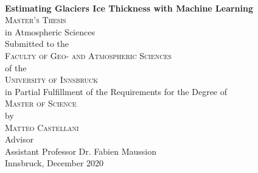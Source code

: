 \begin{titlepage}
\begin{center}

~\\[15mm]
{\Huge  {\bf Estimating Glaciers Ice Thickness with Machine Learning}}\\[5mm]




{\Large \textsc{Master's Thesis}} \\[15mm]


{\large in Atmospheric Sciences} \\[15mm]


{\large Submitted to the} \\[2mm]
{\Large \textsc{Faculty of Geo- and Atmospheric Sciences}} \\[2mm]
{\large of the} \\[2mm]
{\Large \textsc{University of Innsbruck}} \\[15mm]


{\large in Partial Fulfillment of the Requirements for the Degree of} \\[2mm]
{\Large \textsc{Master of Science}} \\[15mm]


{\large by} \\[2mm]
{\Large \textsc{Matteo Castellani}} \\[15mm]


{\large Advisor} \\[2mm]
{\large Assistant Professor Dr. Fabien Maussion} \\[15mm]


{\large Innsbruck, December 2020}


\end{center}
\end{titlepage}
